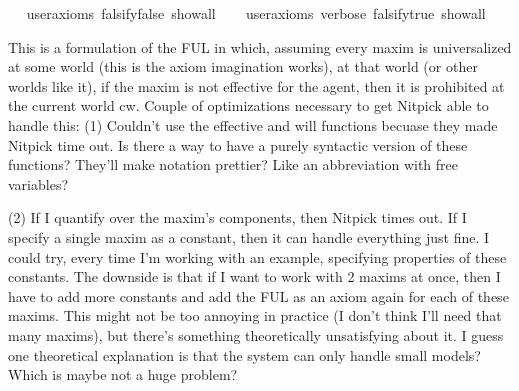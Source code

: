 \begin{isabellebody}
\ \ \isamarkupfalse%
{\isacharbrackleft}user{\isacharunderscore}axioms{\isacharcomma}\ falsify{\isacharequal}false{\isacharcomma}\ show{\isacharunderscore}all{\isacharbrackright}\ \isanewline
\ \ \isamarkupfalse%
{\isacharbrackleft}user{\isacharunderscore}axioms{\isacharcomma}\ verbose{\isacharcomma}\ falsify{\isacharequal}true{\isacharcomma}\ show{\isacharunderscore}all{\isacharbrackright}%
\isadelimproof
\ %
\endisadelimproof
%
\isatagproof
{}\isamarkupfalse%
%
\endisatagproof
{\isafoldproof}%
%
\isadelimproof
%
\endisadelimproof
%
\begin{isamarkuptext}%
This is a formulation of the FUL in which, assuming every maxim is universalized at some
world (this is the axiom imagination works), at that world (or other worlds like it), if the maxim is 
not effective for the agent, then it is prohibited at the current world cw. Couple of optimizations 
necessary to get Nitpick able to handle this:
(1) Couldn't use the effective and will functions becuase they made Nitpick time out. Is there a way 
to have a purely syntactic version of these functions? They'll make notation prettier? Like an 
abbreviation with free variables?

(2) If I quantify over the maxim's components, then Nitpick times out. If I specify a 
single maxim as a constant, then it can handle everything just fine. I could try, every 
time I'm working with an example, specifying properties of these constants. The downside is that if I want 
to work with 2 maxims at once, then I have to add more constants and add the FUL as an axiom again for each of these maxims. This might not 
be too annoying in practice (I don't think I'll need that many maxims), but there's something theoretically
unsatisfying about it. I guess one theoretical explanation is that the system can only handle small models?
Which is maybe not a huge problem?%
\end{isamarkuptext}\isamarkuptrue%
%
\isadelimtheory
%
\endisadelimtheory
%
\isatagtheory
%
\endisatagtheory
{\isafoldtheory}%
%
\isadelimtheory
%
\endisadelimtheory
%
\end{isabellebody}%
\endinput

